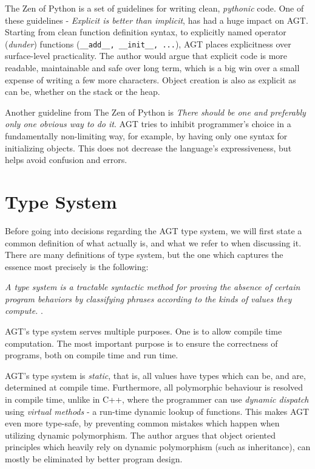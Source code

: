 \documentclass[times, utf8, diplomski]{fer}
\theoremstyle{definition}
\begin{document}
The Zen of Python \citep{c_zen} is a set of guidelines for writing clean, \textit{pythonic} code. 
One of these guidelines - \textit{Explicit is better than implicit}, has had a huge impact on AGT.
Starting from clean function definition syntax, to explicitly named operator (\textit{dunder}) functions
(\texttt{\_\_add\_\_, \_\_init\_\_, ...}), AGT places explicitness over surface-level practicality.
The author would argue that explicit code is more readable, maintainable and safe over long term,
which is a big win over a small expense of writing a few more characters.
Object creation is also as explicit as can be, whether on the stack or the heap.

Another guideline from The Zen of Python is 
\textit{There should be one and preferably only one obvious way to do it}. 
AGT tries to inhibit programmer's choice in a fundamentally non-limiting way, for example, by
having only one syntax for initializing objects. This does not decrease the 
language's expressiveness, but helps avoid confusion and errors.

\section{Type System}

Before going into decisions regarding the AGT type system, we will first state a common
definition of what  actually is, and what we refer to when discussing it.
There are many definitions of type system, 
but the one which captures the essence most precisely is the following:

\textit{
A type system is a tractable syntactic method for proving the absence of certain program 
behaviors by classifying phrases according to the kinds of values they compute.
}\citep{c_type_system}.

AGT's type system serves multiple purposes. One is to allow compile time computation.
The most important purpose is to ensure the correctness of programs, both on compile time and run time.

AGT's type system is \textit{static}, that is, 
all values have types which can be, and are, determined
at compile time. Furthermore, all polymorphic behaviour is resolved in compile time, unlike in C++,
where the programmer can use \textit{dynamic dispatch} using \textit{virtual methods} \citep{c_virtual} 
- a run-time dynamic lookup of functions.
This makes AGT even more type-safe, by preventing common mistakes which happen when utilizing
dynamic polymorphism. The author argues that object oriented principles which heavily rely on
dynamic polymorphism (such as inheritance), can mostly be eliminated by better program design.
\end{document}
